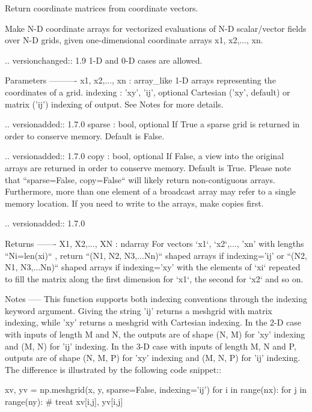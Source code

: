 \begin{DoxyVerb}Return coordinate matrices from coordinate vectors.

Make N-D coordinate arrays for vectorized evaluations of
N-D scalar/vector fields over N-D grids, given
one-dimensional coordinate arrays x1, x2,..., xn.

.. versionchanged:: 1.9
   1-D and 0-D cases are allowed.

Parameters
----------
x1, x2,..., xn : array_like
    1-D arrays representing the coordinates of a grid.
indexing : {'xy', 'ij'}, optional
    Cartesian ('xy', default) or matrix ('ij') indexing of output.
    See Notes for more details.

    .. versionadded:: 1.7.0
sparse : bool, optional
    If True a sparse grid is returned in order to conserve memory.
    Default is False.

    .. versionadded:: 1.7.0
copy : bool, optional
    If False, a view into the original arrays are returned in order to
    conserve memory.  Default is True.  Please note that
    ``sparse=False, copy=False`` will likely return non-contiguous
    arrays.  Furthermore, more than one element of a broadcast array
    may refer to a single memory location.  If you need to write to the
    arrays, make copies first.

    .. versionadded:: 1.7.0

Returns
-------
X1, X2,..., XN : ndarray
    For vectors `x1`, `x2`,..., 'xn' with lengths ``Ni=len(xi)`` ,
    return ``(N1, N2, N3,...Nn)`` shaped arrays if indexing='ij'
    or ``(N2, N1, N3,...Nn)`` shaped arrays if indexing='xy'
    with the elements of `xi` repeated to fill the matrix along
    the first dimension for `x1`, the second for `x2` and so on.

Notes
-----
This function supports both indexing conventions through the indexing
keyword argument.  Giving the string 'ij' returns a meshgrid with
matrix indexing, while 'xy' returns a meshgrid with Cartesian indexing.
In the 2-D case with inputs of length M and N, the outputs are of shape
(N, M) for 'xy' indexing and (M, N) for 'ij' indexing.  In the 3-D case
with inputs of length M, N and P, outputs are of shape (N, M, P) for
'xy' indexing and (M, N, P) for 'ij' indexing.  The difference is
illustrated by the following code snippet::

    xv, yv = np.meshgrid(x, y, sparse=False, indexing='ij')
    for i in range(nx):
        for j in range(ny):
            # treat xv[i,j], yv[i,j]


\end{DoxyVerb}
